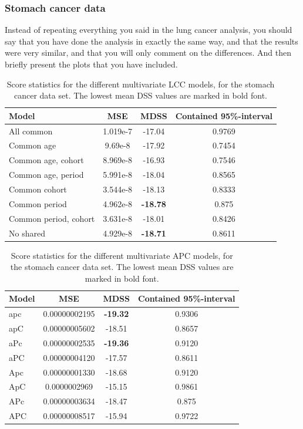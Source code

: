 \newpage
\subsubsection{Stomach cancer data}
\textcolor{myDarkGreen}{Instead of repeating everything you said in the lung cancer analysis, you should say that you have done the analysis in exactly the same way, and that the results were very similar, and that you will only comment on the differences. And then briefly present the plots that you have included. }

\begin{table}[h!]
    \begin{tabular}{l |c c c }
        Model & MSE & MDSS & Contained 95\%-interval\\
        \hline
        All common            & 1.019e-7  & -17.04    & 0.9769 \\
        Common age            &  9.69e-8 & -17.92    & 0.7454 \\
        Common age, cohort    & 8.969e-8 & -16.93    & 0.7546 \\
        Common age, period    & 5.991e-8 & -18.04    & 0.8565 \\
        Common cohort         &  3.544e-8 & -18.13   & 0.8333 \\
        Common period         &  4.962e-8 & \textbf{-18.78}   & 0.875  \\
        Common period, cohort & 3.631e-8 & -18.01    & 0.8426 \\
        No shared             &  4.929e-8 & \textbf{-18.71}    & 0.8611 \\
    \end{tabular}
    \caption{\label{tab:LCC-stomach}Score statistics for the different multivariate LCC models, for the stomach cancer data set. The lowest mean DSS values are marked in bold font. }
\end{table}

\begin{table}[h!]
    \begin{tabular}{l |c c c }
        Model & MSE & MDSS & Contained 95\%-interval\\
        \hline
        apc    &0.00000002195 &\textbf{-19.32}    &0.9306 \\
        apC    &0.00000005602 &-18.51    &0.8657 \\
        aPc    &0.00000002535 &\textbf{-19.36}    &0.9120 \\
        aPC    &0.00000004120 &-17.57    &0.8611 \\
        Apc    &0.00000001330 &-18.68    &0.9120 \\
        ApC    &0.0000002969  &-15.15    &0.9861 \\
        APc    &0.00000003634 &-18.47    &0.875  \\
        APC    &0.00000008517 &-15.94    &0.9722 \\
    \end{tabular}
    \caption{\label{tab:APC-stomach}Score statistics for the different multivariate APC models, for the stomach cancer data set. The lowest mean DSS values are marked in bold font. }
\end{table}

